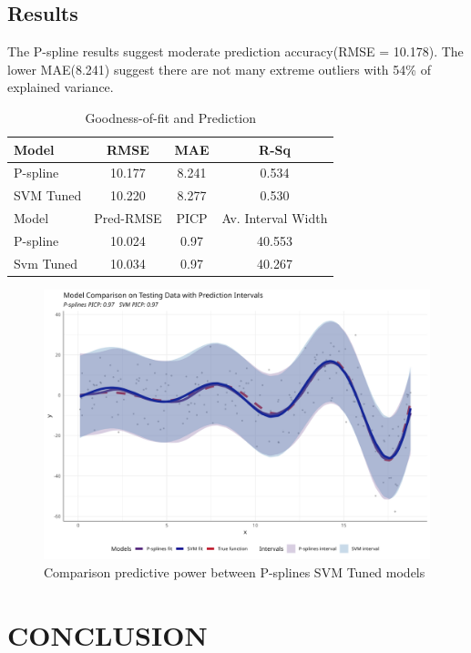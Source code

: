 \documentclass[8pt,twocolumn]{article}
\begin{document}
\subsection{Results}

The P-spline results suggest moderate prediction accuracy(RMSE = 10.178). The lower MAE(8.241) suggest there are not many extreme outliers with 54\% of explained variance.

\begin{table}[ht]
  \centering
  \caption{Goodness-of-fit and Prediction}
  \setlength{\tabcolsep}{4pt}
  \begin{tabular}{@{}lccc@{}}
    \toprule
      Model & RMSE & MAE & R-Sq  \\
    \midrule
      P-spline & 10.177 & 8.241 & 0.534 \\
      SVM Tuned & 10.220 & 8.277 & 0.530 \\ 
    \midrule
     Model & Pred-RMSE & PICP & Av. Interval Width \\
    \midrule
      P-spline & 10.024 & 0.97 & 40.553\\
      Svm Tuned & 10.034 & 0.97 & 40.267 \\
    \bottomrule
  \end{tabular}
\end{table}


\begin{figure}[htbp]
    \centering
    \includegraphics[width=0.8\columnwidth]{img7.png}
    \caption{Comparison predictive power between P-splines SVM Tuned models}
    \vspace{-10pt}
\end{figure}



\section{CONCLUSION}



\end{document}
